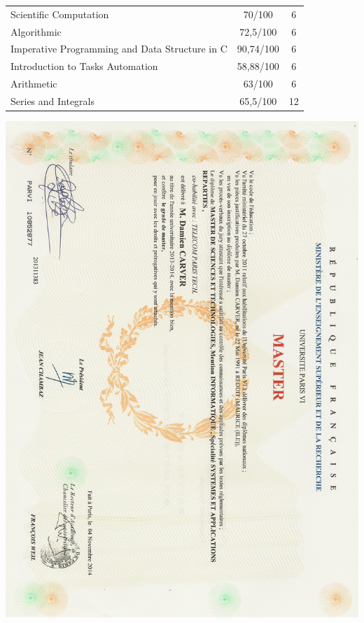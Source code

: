 \begin{center}
\begin{tabular}{lcc}
Scientific Computation                                     &    70/100 & 6     \\
Algorithmic                                                &  72,5/100 & 6     \\
\hline
Imperative Programming and Data Structure in C             & 90,74/100 & 6     \\
Introduction to Tasks Automation                           & 58,88/100 & 6     \\
Arithmetic                                                 &    63/100 & 6     \\
Series and Integrals                                       &  65,5/100 & 12    \\
\hline
\end{tabular}
\end{center}


\newpage

\includegraphics[scale=0.7]{./m2.jpeg}

